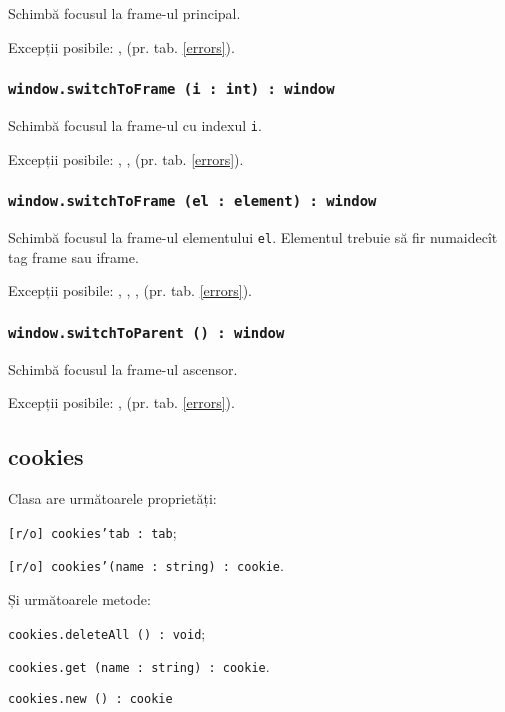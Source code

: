 Schimbă focusul la frame-ul principal.

Excepții posibile: ,  (pr. tab. \ref{errors}).

\subsubsection{\texttt{window.switchToFrame (i : int) : window}}

Schimbă focusul la frame-ul cu indexul \texttt{i}.

Excepții posibile: , ,  (pr. tab. \ref{errors}).

\subsubsection{\texttt{window.switchToFrame (el : element) : window}}

Schimbă focusul la frame-ul elementului \texttt{el}. Elementul trebuie să fir numaidecît tag frame sau iframe.

Excepții posibile: , , ,  (pr. tab. \ref{errors}).

\subsubsection{\texttt{window.switchToParent () : window}}

Schimbă focusul la frame-ul ascensor.

Excepții posibile: ,  (pr. tab. \ref{errors}).

\subsection{cookies}

Clasa \cookies{} are următoarele proprietăți:
\begin{icItems}
	\item \texttt{[r/o] cookies'tab : tab};
	\item \texttt{[r/o] cookies'(name : string) : cookie}.
\end{icItems}

Și următoarele metode: 
\begin{icItems}
	\item \texttt{cookies.deleteAll () : void};
	\item \texttt{cookies.get (name : string) : cookie}.
	\item \texttt{cookies.new () : cookie}
\end{icItems}

